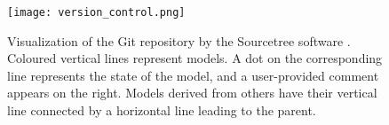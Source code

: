 \begin{figure}[ht]
	\centering
	\texttt{[image: version\_control.png]}	
	\caption[Visualization of the Git repository by the Sourcetree software]{Visualization of the Git repository by the Sourcetree software \citep{atlassian2019}. Coloured vertical lines represent models. A dot on the corresponding line represents the state of the model, and a user-provided comment appears on the right. Models derived from others have their vertical line connected by a horizontal line leading to the parent.} 
	\label{fig:version_control}
\end{figure}